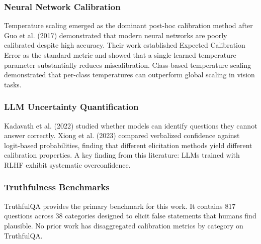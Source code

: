 
\subsubsection{Neural Network Calibration}

Temperature scaling emerged as the dominant post-hoc calibration method after Guo et al. (2017) demonstrated that modern neural networks are poorly calibrated despite high accuracy. Their work established Expected Calibration Error as the standard metric and showed that a single learned temperature parameter substantially reduces miscalibration. Class-based temperature scaling \citep{frenkel2021class} demonstrated that per-class temperatures can outperform global scaling in vision tasks.

\subsubsection{LLM Uncertainty Quantification}

Kadavath et al. (2022) studied whether models can identify questions they cannot answer correctly. Xiong et al. (2023) compared verbalized confidence against logit-based probabilities, finding that different elicitation methods yield different calibration properties. A key finding from this literature: LLMs trained with RLHF exhibit systematic overconfidence.

\subsubsection{Truthfulness Benchmarks}

TruthfulQA \citep{lin2022truthfulqa} provides the primary benchmark for this work. It contains 817 questions across 38 categories designed to elicit false statements that humans find plausible. No prior work has disaggregated calibration metrics by category on TruthfulQA.
